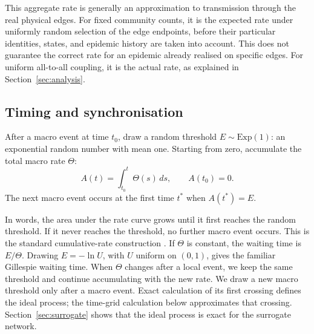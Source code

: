 \documentclass[a4paper,fleqn]{cas-sc}
\newcommand{\Exp}{\mathrm{Exp}}
\begin{document}
This aggregate rate is generally an approximation to transmission through the real physical edges. For fixed community counts, it is the expected rate under uniformly random selection of the edge endpoints, before their particular identities, states, and epidemic history are taken into account. This does not guarantee the correct rate for an epidemic already realised on specific edges. For uniform all-to-all coupling, it is the actual rate, as explained in Section~\ref*{sec:analysis}.

\subsection{Timing and synchronisation}
\label{sec:timing}

After a macro event at time $t_0$, draw a random threshold $E\sim\Exp(1)$: an exponential random number with mean one. Starting from zero, accumulate the total macro rate $\Theta$:
\begin{equation}
\label{eq:hazard_integral}
A(t)=\int_{t_0}^{t}\Theta(s)\,ds,
\qquad A(t_0)=0.
\end{equation}
The next macro event occurs at the first time $t^\ast$ when $A(t^\ast)=E$.

In words, the area under the rate curve grows until it first reaches the random threshold. If it never reaches the threshold, no further macro event occurs. This is the standard cumulative-rate construction \citep{ethier1986,anderson2007}. If $\Theta$ is constant, the waiting time is $E/\Theta$. Drawing $E=-\ln U$, with $U$ uniform on $(0,1)$, gives the familiar Gillespie waiting time. When $\Theta$ changes after a local event, we keep the same threshold and continue accumulating with the new rate. We draw a new macro threshold only after a macro event. Exact calculation of its first crossing defines the ideal process; the time-grid calculation below approximates that crossing. Section~\ref*{sec:surrogate} shows that the ideal process is exact for the surrogate network.
\end{document}
